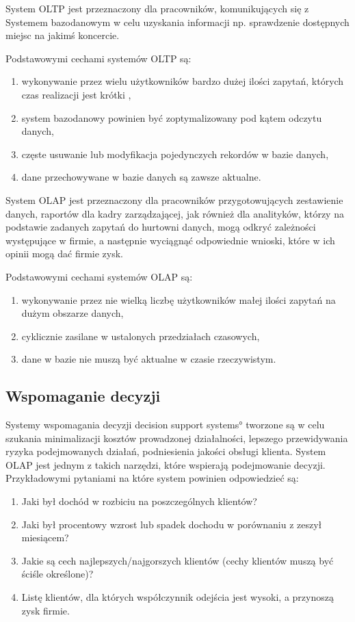 System OLTP jest przeznaczony dla pracowników, komunikujących się 
 z Systemem bazodanowym w celu uzyskania informacji 
 np. sprawdzenie dostępnych miejsc na jakimś koncercie.

Podstawowymi cechami systemów OLTP są:
\begin{enumerate}
 \item wykonywanie przez wielu użytkowników bardzo dużej ilości zapytań, których czas realizacji jest krótki \label{OLTP_1},
 \item system bazodanowy powinien być zoptymalizowany pod kątem odczytu danych,
 \item częste usuwanie lub modyfikacja pojedynczych rekordów w bazie danych,
 \item dane przechowywane w bazie danych są zawsze aktualne.
\end{enumerate}

System OLAP jest przeznaczony dla pracowników przygotowujących zestawienie danych,
 raportów dla kadry zarządzającej, jak również dla analityków, 
 którzy na podstawie zadanych zapytań do hurtowni danych,
 mogą odkryć zależności występujące w firmie, a następnie wyciągnąć odpowiednie wnioski,
 które w ich opinii mogą dać firmie zysk.
 
Podstawowymi cechami systemów OLAP są:
\begin{enumerate}
 \item wykonywanie przez nie wielką liczbę użytkowników małej ilości zapytań na dużym obszarze danych,
 \item cyklicznie zasilane w ustalonych przedziałach czasowych,
 \item dane w bazie nie muszą być aktualne w czasie rzeczywistym.
\end{enumerate}


\subsection{Wspomaganie decyzji }
Systemy wspomagania decyzji \ang{decision support systems} tworzone są 
 w celu szukania minimalizacji kosztów prowadzonej działalności,
 lepszego przewidywania ryzyka podejmowanych działań, podniesienia jakości obsługi klienta. System OLAP jest 
 jednym z takich narzędzi, które wspierają podejmowanie decyzji.
Przykładowymi pytaniami na które system powinien odpowiedzieć są:
 \begin{enumerate}
  \item Jaki był dochód w rozbiciu na poszczególnych klientów?
  \item Jaki był procentowy wzrost lub spadek dochodu w porównaniu z zeszył miesiącem?
  \item Jakie są cech najlepszych/najgorszych klientów (cechy klientów muszą być ściśle określone)?
  \item Listę klientów, dla których współczynnik odejścia jest wysoki, a przynoszą zysk firmie.
 
 \end{enumerate}

